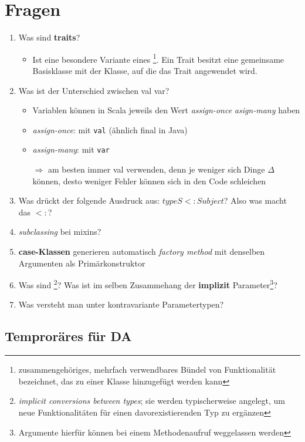 \section{Fragen}
\begin{enumerate}
  \item Was sind \textbf{traits}?
  \begin{itemize}
    \item Ist eine besondere Variante eines \footnote{zusammengehöriges, mehrfach verwendbares Bündel von Funktionalität bezeichnet, das zu einer Klasse hinzugefügt werden kann}. Ein Trait besitzt 
    eine gemeinsame Basisklasse mit der Klasse, auf die das Trait 
    angewendet wird.
  \end{itemize}
  \item Was ist der Unterschied zwischen val \und var?
  \begin{itemize}
    \item Variablen können in Scala jeweils den Wert 
    \textit{assign-once} \oder \textit{asign-many} haben
    \item \textit{assign-once}: mit \texttt{val} (ähnlich final
    in Java)
    \item \textit{assign-many}: mit \texttt{var}
    
    $\Rightarrow$ am besten immer val verwenden, denn je weniger
    sich Dinge $\Delta$ können, desto weniger Fehler können sich
    in den Code schleichen
  \end{itemize}
  \item Was drückt der folgende Ausdruck aus: $type S <: Subject$? Also was
  macht das $<:$?
  \item \textit{subclassing} bei mixins?
  \item \textbf{case-Klassen} generieren automatisch \textit{factory method} 
  mit denselben Argumenten als Primärkonstruktor
  \item Was sind \footnote{\textit{implicit conversions between
  types}; sie werden typischerweise angelegt, um neue Funktionalitäten
  für einen davorexistierenden Typ zu ergänzen}? Was ist im selben Zusammehang der 
  \textbf{implizit} Parameter\footnote{Argumente hierfür können bei einem
  Methodenaufruf weggelassen werden}?
  \item Was versteht man unter kontravariante Parametertypen?
\end{enumerate}



\subsection{Temproräres für DA}


